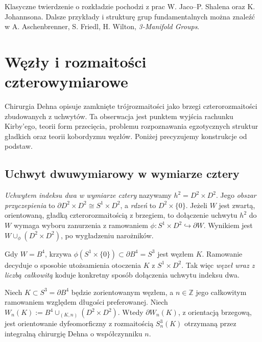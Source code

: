 \begin{uwaga}[Literatura]
Klasyczne twierdzenie o rozkładzie pochodzi z prac
W. Jaco--P. Shalena oraz K. Johannsona.
Dalsze przykłady i strukturę grup fundamentalnych
można znaleźć w A. Aschenbrenner,
S. Friedl, H. Wilton, \emph{3-Manifold Groups}.
\end{uwaga}


\chapter{Węzły i rozmaitości czterowymiarowe}
\label{ch:kt-cztery}

Chirurgia Dehna opisuje zamknięte trójrozmaitości jako brzegi
czterorozmaitości zbudowanych z uchwytów. Ta obserwacja jest
punktem wyjścia rachunku Kirby'ego, teorii form przecięcia,
problemu rozpoznawania egzotycznych struktur gładkich oraz
teorii kobordyzmu węzłów. Poniżej precyzujemy konstrukcje
od podstaw.

\section{Uchwyt dwuwymiarowy w wymiarze cztery}
\label{sec:kt-uchwyty}

\begin{definicja}
\emph{Uchwytem indeksu dwa w wymiarze cztery} nazywamy
$h^2=D^2\times D^2$. Jego \emph{obszar przyczepienia}
to $\partial D^2\times D^2\cong S^1\times D^2$,
a \emph{rdzeń} to $D^2\times\{0\}$.
Jeżeli $W$ jest zwartą, orientowaną, gładką czterorozmaitością
z brzegiem, to dołączenie uchwytu $h^2$ do $W$ wymaga
wyboru zanurzenia z ramowaniem
$\phi\colon S^1\times D^2\hookrightarrow\partial W$.
Wynikiem jest $W\cup_\phi(D^2\times D^2)$, po wygładzeniu
narożników.
\end{definicja}

Gdy $W=B^4$, krzywa $\phi(S^1\times\{0\})\subset\partial B^4=S^3$
jest węzłem $K$. Ramowanie decyduje o sposobie utożsamienia
otoczenia $K$ z $S^1\times D^2$. Tak więc \emph{węzeł wraz
z liczbą całkowitą} koduje konkretny sposób dołączenia
uchwytu indeksu dwa.

\begin{twierdzenie}
Niech $K\subset S^3=\partial B^4$ będzie zorientowanym węzłem,
a $n\in\mathbb Z$ jego całkowitym ramowaniem względem długości
preferowanej. Niech
$W_n(K):=B^4\cup_{(K,n)}(D^2\times D^2)$.
Wtedy $\partial W_n(K)$, z orientacją brzegową, jest
orientowanie dyfeomorficzny z rozmaitością $S^3_n(K)$
otrzymaną przez integralną chirurgię Dehna o współczynniku $n$.
\end{twierdzenie}

